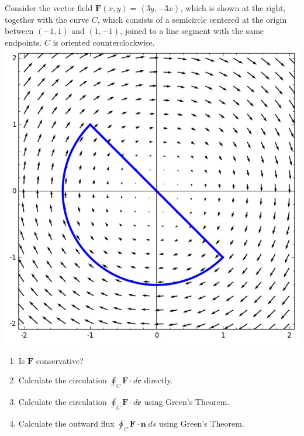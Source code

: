 \documentclass[12pt]{article}
\begin{document}
\begin{multicols}{2}
Consider the vector field $\mathbold{F}\left(x,y\right)
=\left\langle 3y,-3x\right\rangle$, which is shown
at the right, together with the curve $C$,
which consists of a semicircle centered at the origin
between $\left(-1,1\right)$ and $\left(1,-1\right)$,
joined to a line segment with the same endpoints.
$C$ is oriented counterclockwise.
\includegraphics[scale=.6]{Cardioid}
\end{multicols}

\begin{enumerate}
\item Is $\mathbold{F}$ conservative?
\vspace{1in}
\item Calculate the circulation $\oint_C\mathbold{F}
\cdot d\mathbold{r}$ directly.
\vspace{2in}
\item Calculate the circulation $\oint_C\mathbold{F}
\cdot d\mathbold{r}$ using Green's Theorem.
\vspace{4in}
\item Calculate the outward flux $\oint_C\mathbold{F}
\cdot\mathbold{n}\;ds$ using Green's Theorem.
\end{enumerate}
\end{document}
